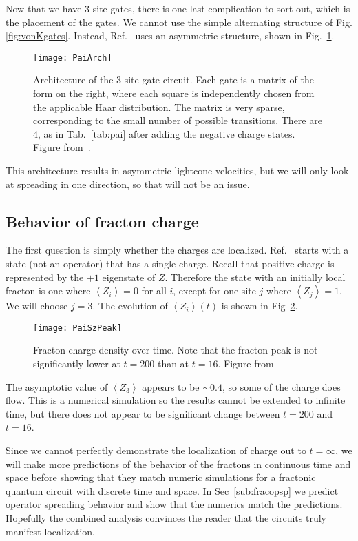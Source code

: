 \documentclass[a4paper,11pt]{article}
\newcommand{\ex}[1]{\left\langle #1 \right\rangle}
\begin{document}
Now that we have 3-site gates, there is one last complication to sort out, which is the placement of the gates. We cannot use the simple alternating structure of Fig.\ref{fig:vonKgates}. Instead, Ref.~\cite{PaiFracton} uses an asymmetric structure, shown in Fig.~\ref{fig:PaiArch}.
\begin{figure}
	\centering
	\texttt{[image: PaiArch]}
	\caption{Architecture of the 3-site gate circuit. Each gate is a matrix of the form on the right, where each square is independently chosen from the applicable Haar distribution. The matrix is very sparse, corresponding to the small number of possible transitions. There are 4, as in Tab.~\ref{tab:pai} after adding the negative charge states. Figure from~\cite{PaiFracton}.}
	\label{fig:PaiArch}
\end{figure}
This architecture results in asymmetric lightcone velocities, but we will only look at spreading in one direction, so that will not be an issue.

\subsection{Behavior of fracton charge} \label{sub:fraccharge}

The first question is simply whether the charges are localized. Ref.~\cite{PaiFracton} starts with a state (not an operator) that has a single charge. 
Recall that positive charge is represented by the $+1$ eigenstate of $Z$. Therefore the state with an initially local fracton is one where $\ex{Z_i}=0$ for all $i$, except for one site $j$ where $\ex{Z_j}=1$. We will choose $j=3$.
The evolution of $\ex{Z_i}(t)$ is shown in Fig~\ref{fig:PaiSzPeak}.
\begin{figure}
	\centering
	\texttt{[image: PaiSzPeak]}
	\caption{Fracton charge density over time. Note that the fracton peak is not significantly lower at $t=200$ than at $t=16$. Figure from~\cite{PaiFracton}}
	\label{fig:PaiSzPeak}
\end{figure}
The asymptotic value of $\ex{Z_3}$ appears to be $\sim0.4$, so some of the charge does flow. This is a numerical simulation so the results cannot be extended to infinite time, but there does not appear to be significant change between $t=200$ and $t=16$.

Since we cannot perfectly demonstrate the localization of charge out to $t=\infty$, we will make more predictions of the behavior of the fractons in continuous time and space before showing that they match numeric simulations for a fractonic quantum circuit with discrete time and space. In Sec~\ref{sub:fracopsp} we predict operator spreading behavior and show that the numerics match the predictions. Hopefully the combined analysis convinces the reader that the circuits truly manifest localization.
\end{document}

